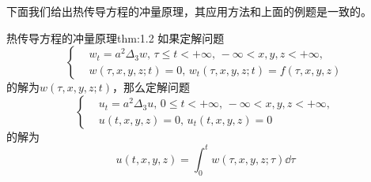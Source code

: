 下面我们给出热传导方程的冲量原理，其应用方法和上面的例题是一致的。
\begin{theorem}{热传导方程的冲量原理}{thm:1.2}
    如果定解问题
    \begin{equation*}
        \left\{
            \begin{aligned}
                &w_{t} = a^2 \Delta_3 w,\, \tau \leq t < +\infty,\, -\infty< x, y, z < +\infty,\\
                &w(\tau, x, y, z; t) = 0,\, w_t(\tau, x, y, z; t) = f(\tau, x, y, z)
            \end{aligned}
        \right.
    \end{equation*}
    的解为$w(\tau, x, y, z; t)$，那么定解问题
    \begin{equation*}
        \left\{
            \begin{aligned}
                &u_{t} = a^2 \Delta_3 u,\, 0 \leq t < +\infty,\, -\infty< x, y, z < +\infty,\\
                &u(t, x, y, z) = 0,\, u_t(t, x, y, z) = 0
            \end{aligned}
        \right.
    \end{equation*}
    的解为
    \[u(t, x, y, z) = \int_{0}^{t} w(\tau, x, y, z; \tau) \dd{\tau}\]
\end{theorem}